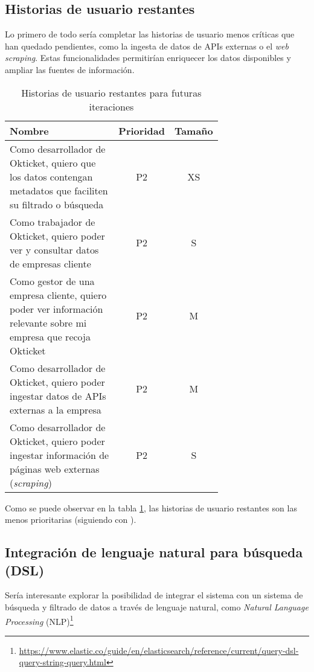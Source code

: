 \subsection{Historias de usuario restantes}
Lo primero de todo sería completar las historias de usuario menos críticas que
han quedado pendientes, como la ingesta de datos de APIs externas o el
\textit{web scraping}. Estas funcionalidades permitirían enriquecer los datos
disponibles y ampliar las fuentes de información.

\begin{table}[H]
	\centering
	\begin{tabular}{|p{0.7\linewidth}|c|c|}
		\hline
		\textbf{Nombre} & \textbf{Prioridad} & \textbf{Tamaño} \\
		\hline
		\hline
		Como desarrollador de Okticket, quiero que los datos contengan metadatos que faciliten su filtrado o búsqueda & P2\cellcolor{yellow!50} & XS\cellcolor{blue!25} \\
		\hline
		Como trabajador de Okticket, quiero poder ver y consultar datos de empresas cliente & P2\cellcolor{yellow!50} & S\cellcolor{green!25} \\
		\hline
		Como gestor de una empresa cliente, quiero poder ver información relevante sobre mi empresa que recoja Okticket & P2\cellcolor{yellow!50} & M\cellcolor{yellow!50} \\
		\hline
		Como desarrollador de Okticket, quiero poder ingestar datos de APIs externas a la empresa & P2\cellcolor{yellow!50} & M\cellcolor{yellow!50} \\
		\hline
		Como desarrollador de Okticket, quiero poder ingestar información de páginas web externas (\textit{scraping}) & P2\cellcolor{yellow!50} & S\cellcolor{green!25} \\
		\hline
	\end{tabular}
	\caption{Historias de usuario restantes para futuras iteraciones}
	\label{tab:remaining_tasks}
\end{table}

Como se puede observar en la tabla \ref{tab:remaining_tasks}, las historias de
usuario restantes son las menos prioritarias (siguiendo con
).

\newpage{}
\subsection{Integración de lenguaje natural para búsqueda (DSL)}
Sería interesante explorar la posibilidad de integrar el sistema con
un sistema de búsqueda y filtrado de datos a través de lenguaje natural, como
\textit{Natural Language Processing} (NLP)\footnote{
	\url{https://www.elastic.co/guide/en/elasticsearch/reference/current/query-dsl-query-string-query.html}
}

